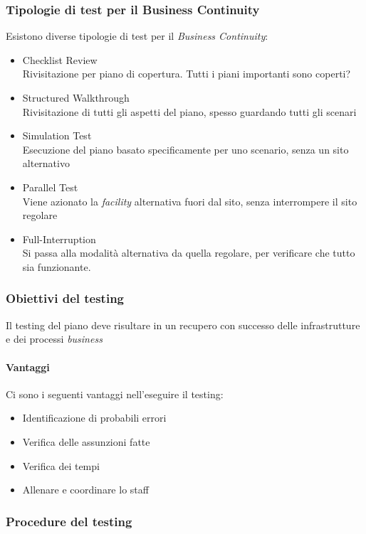 \subsubsection{Tipologie di test per il Business Continuity}

Esistono diverse tipologie di test per il \textit{Business Continuity}:
\begin{itemize}
  \item Checklist Review \\
  Rivisitazione per piano di copertura. Tutti i piani importanti sono coperti?
  \item Structured Walkthrough \\
  Rivisitazione di tutti gli aspetti del piano, spesso guardando tutti gli 
  scenari
  \item Simulation Test \\
  Esecuzione del piano basato specificamente per uno scenario, senza un sito 
  alternativo
  \item Parallel Test \\
  Viene azionato la \textit{facility} alternativa fuori dal sito, senza 
  interrompere il sito regolare
  \item Full-Interruption \\
  Si passa alla modalità alternativa da quella regolare, per verificare che 
  tutto sia funzionante.
\end{itemize}

\subsubsection{Obiettivi del testing}

Il testing del piano deve risultare in un recupero con successo delle 
infrastrutture e dei processi \textit{business}

\paragraph*{Vantaggi} Ci sono i seguenti vantaggi nell'eseguire il testing:
\begin{itemize}
  \item Identificazione di probabili errori
  \item Verifica delle assunzioni fatte
  \item Verifica dei tempi
  \item Allenare e coordinare lo staff
\end{itemize}

\subsubsection{Procedure del testing}

